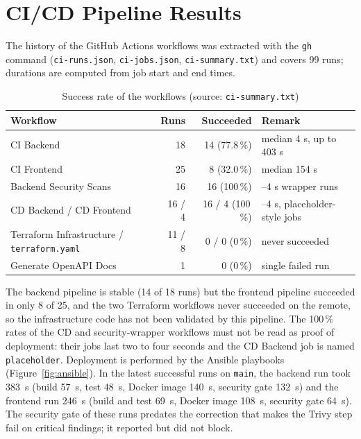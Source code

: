 \section{CI/CD Pipeline Results}\label{sec:res-ci}

The history of the GitHub Actions workflows was extracted with the \texttt{gh} command (\texttt{ci-runs.json}, \texttt{ci-jobs.json}, \texttt{ci-summary.txt}) and covers 99 runs; durations are computed from job start and end times.

\begin{table}[H]
\centering\small
\caption{Success rate of the workflows (source: \texttt{ci-summary.txt})}\label{tab:ci-rates}
\begin{tabularx}{\linewidth}{@{}Xrr>{\raggedright\arraybackslash}p{4.2cm}@{}}
\toprule
\textbf{Workflow} & \textbf{Runs} & \textbf{Succeeded} & \textbf{Remark} \\
\midrule
CI Backend & 18 & 14 (77.8\,\%) & median 4 s, up to 403 s \\
CI Frontend & 25 & 8 (32.0\,\%) & median 154 s \\
Backend Security Scans & 16 & 16 (100\,\%) & 2--4 s wrapper runs \\
CD Backend / CD Frontend & 16 / 4 & 16 / 4 (100\,\%) & 2--4 s, placeholder-style jobs \\
Terraform Infrastructure / \texttt{terraform.yaml} & 11 / 8 & 0 / 0 (0\,\%) & never succeeded \\
Generate OpenAPI Docs & 1 & 0 (0\,\%) & single failed run \\
\bottomrule
\end{tabularx}
\end{table}

The backend pipeline is stable (14 of 18 runs) but the frontend pipeline succeeded in only 8 of 25, and the two Terraform workflows never succeeded on the remote, so the infrastructure code has not been validated by this pipeline. The 100\,\% rates of the CD and security-wrapper workflows must not be read as proof of deployment: their jobs last two to four seconds and the CD Backend job is named \texttt{placeholder}. Deployment is performed by the Ansible playbooks (Figure~\ref{fig:ansible}). In the latest successful runs on \texttt{main}, the backend run took 383~s (build 57~s, test 48~s, Docker image 140~s, security gate 132~s) and the frontend run 246~s (build and test 69~s, Docker image 108~s, security gate 64~s). The security gate of these runs predates the correction that makes the Trivy step fail on critical findings; it reported but did not block.


